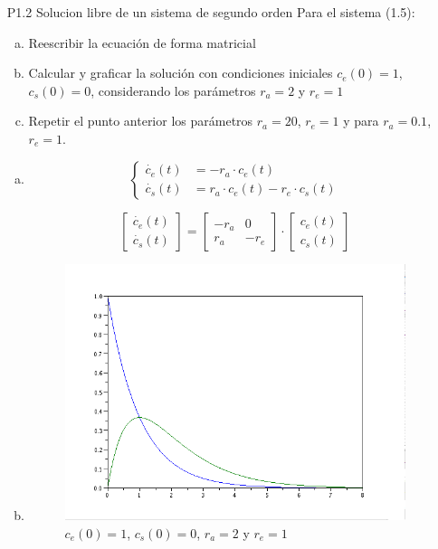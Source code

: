 \documentclass{article}
\begin{document}
\begin{itemize}
  \item[P1.2] Solucion libre de un sistema de segundo orden
        Para el sistema (1.5):
        \begin{enumerate}[a)]
        \item Reescribir la ecuación de forma matricial
        \item Calcular y graficar la solución con condiciones iniciales $c_{e}(0)=1$, $c_{s}(0)=0$, considerando los parámetros $r_{a}=2$ y $r_{e}=1$
        \item Repetir el punto anterior los parámetros $r_{a}=20$, $r_{e}=1$ y para $r_{a} = 0.1$, $r_{e}=1$.
        \end{enumerate}

        \begin{enumerate}[a)]
\item
\begin{equation}
\left\{ \begin{array}{rl}
  \dot{c_{e}}(t) &= -r_{a} \cdot c_{e}(t) \\
  \dot{c_{s}}(t) &= r_{a} \cdot c_{e}(t) - r_{e} \cdot c_{s}(t)
       \end{array} \right .
 \label{P1.1a} \tag{1.5}
\end{equation}

\begin{equation*}
\begin{bmatrix}
   \dot{c_{e}}(t) \\
   \dot{c_{s}}(t) 
 \end{bmatrix}
=
\begin{bmatrix}
   - r_{a} & 0 \\
     r_{a} & -r_{e}
\end{bmatrix} 
\cdot 
\begin{bmatrix}
   c_{e}(t) \\
   c_{s}(t) 
\end{bmatrix}
\end{equation*}

\item
\begin{figure}[H]
\includegraphics[width=\textwidth]{img/ej02-b.png}
\caption{$c_{e}(0)=1$, $c_{s}(0)=0$, $r_{a}=2$ y $r_{e}=1$ }
\end{figure}


\end{enumerate}
\end{itemize}
\end{document}
